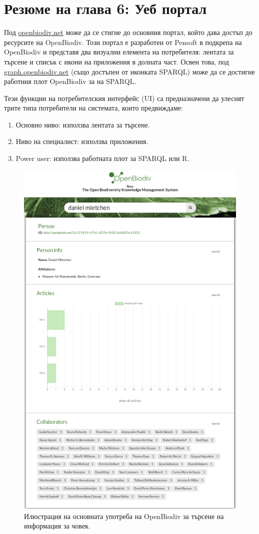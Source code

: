 \chapter{Резюме на глава 6: Уеб портал}
\label{chapter-webportal}

Под \href{http://openbiodiv.net}{openbiodiv.net} може да се стигне до основния портал, който дава достъп до ресурсите на OpenBiodiv. Този портал е разработен от Pensoft в подкрепа на OpenBiodiv и представя два визуални елемента на потребителя: лентата за търсене и списък с икони на приложения в долната част. Освен това, под \href {http://graph.openbiodiv.net}{{graph.openbiodiv.net}} (също достъпен от иконката SPARQL) може да се достигне работния плот OpenBiodiv за  на SPARQL.

Тези функции на потребителския интерфейс (UI) са предназначени да улеснят трите типа потребители на системата, които предвиждаме:

\begin{enumerate}
\item Основно ниво: използва лентата за търсене.
\item Ниво на специалист: използва приложения.
\item Power user: използва работната плот за SPARQL или R.
\end{enumerate}

\begin{figure}
\centering
\includegraphics[width=\textwidth]{Figures/basic-level.png}
\decoRule
\caption{Илюстрация на основната употреба на OpenBiodiv за търсене на информация за човек.}
\label{fig:basic-level}
\end{figure}